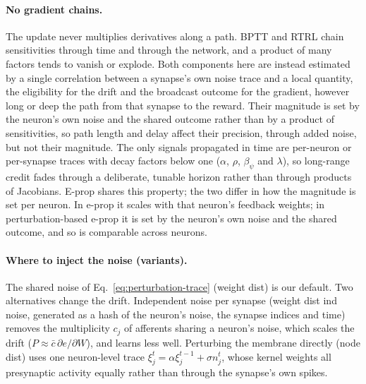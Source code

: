 \documentclass[10pt,twocolumn]{article}
\newcommand{\method}{perturbation-based e-prop}   %
\newcommand{\variant}[1]{\textsf{#1}} %
\begin{document}
\paragraph{No gradient chains.}
The update never multiplies derivatives along a path. BPTT and RTRL chain
sensitivities through time and through the network, and a product of many factors
tends to vanish or explode. Both components here are instead estimated by a single
correlation between a synapse's own noise trace and a local quantity, the
eligibility for the drift and the broadcast outcome for the gradient, however long
or deep the path from that synapse to the reward. Their magnitude is set by the
neuron's own noise and the shared outcome rather than by a product of
sensitivities, so path length and delay affect their precision, through added
noise, but not their magnitude. The only signals propagated in time are per-neuron
or per-synapse traces with decay factors below one ($\alpha$, $\rho$, $\beta_\psi$
and $\lambda$), so long-range credit fades through a deliberate, tunable horizon
rather than through products of Jacobians. E-prop shares this property; the two
differ in how the magnitude is set per neuron. In e-prop it scales with that
neuron's feedback weights; in \method{} it is set by the neuron's own noise and the
shared outcome, and so is comparable across neurons.

\paragraph{Where to inject the noise (variants).}
The shared noise of Eq.~\eqref{eq:perturbation-trace} (\variant{weight dist}) is
our default. Two alternatives change the drift. Independent noise per synapse
(\variant{weight dist ind noise}, generated as a hash of the neuron's noise, the
synapse indices and time) removes the multiplicity $c_j$ of afferents sharing a
neuron's noise, which scales the drift ($P\approx\bar c\,\partial e/\partial W$),
and learns less well. Perturbing the membrane directly (\variant{node dist}) uses
one neuron-level trace $\xi^t_j=\alpha\xi^{t-1}_j+\sigma n^t_j$, whose kernel weights
all presynaptic activity equally rather than through the synapse's own spikes.
\end{document}
